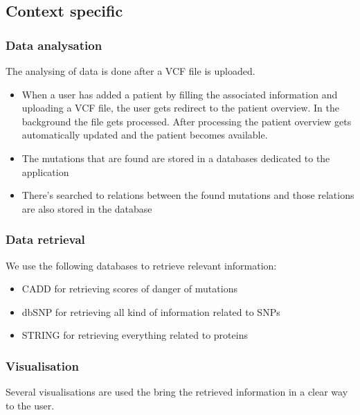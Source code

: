\subsection{Context specific}

\subsubsection{Data analysation}

The analysing of data is done after a VCF file is uploaded.

\begin{itemize}
  \item When a user has added a patient by filling the associated information and uploading a VCF file, the user gets redirect to the patient overview. In the background the file gets processed. After processing the patient overview gets automatically updated and the patient becomes available.
  \item The mutations that are found are stored in a databases dedicated to the application
  \item There's searched to relations between the found mutations and those relations are also stored in the database
\end{itemize}

\subsubsection{Data retrieval}

We use the following databases to retrieve relevant information:

\begin{itemize}
  \item CADD for retrieving scores of danger of mutations
  \item dbSNP for retrieving all kind of information related to SNPs
  \item STRING for retrieving everything related to proteins
\end{itemize}

\subsubsection{Visualisation}

Several visualisations are used the bring the retrieved information in a clear way to the user.

